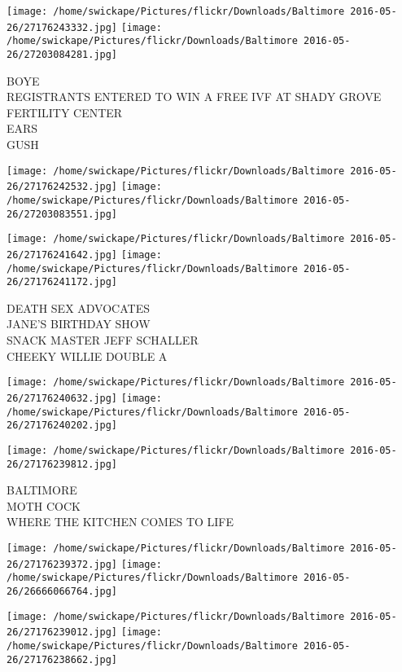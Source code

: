 \documentclass[10pt,letterpaper]{article}
\begin{document}
\texttt{[image: /home/swickape/Pictures/flickr/Downloads/Baltimore 2016-05-26/27176243332.jpg]}
\texttt{[image: /home/swickape/Pictures/flickr/Downloads/Baltimore 2016-05-26/27203084281.jpg]}

BOYE\\
REGISTRANTS ENTERED TO WIN A FREE IVF AT SHADY GROVE FERTILITY CENTER\\
EARS\\
GUSH\\
\pagebreak

\texttt{[image: /home/swickape/Pictures/flickr/Downloads/Baltimore 2016-05-26/27176242532.jpg]}
\texttt{[image: /home/swickape/Pictures/flickr/Downloads/Baltimore 2016-05-26/27203083551.jpg]}

\texttt{[image: /home/swickape/Pictures/flickr/Downloads/Baltimore 2016-05-26/27176241642.jpg]}
\texttt{[image: /home/swickape/Pictures/flickr/Downloads/Baltimore 2016-05-26/27176241172.jpg]}

DEATH SEX ADVOCATES\\
JANE'S BIRTHDAY SHOW\\
SNACK MASTER JEFF SCHALLER\\
CHEEKY WILLIE DOUBLE A\\
\pagebreak

\texttt{[image: /home/swickape/Pictures/flickr/Downloads/Baltimore 2016-05-26/27176240632.jpg]}
\texttt{[image: /home/swickape/Pictures/flickr/Downloads/Baltimore 2016-05-26/27176240202.jpg]}

\vspace{0.25in}
\texttt{[image: /home/swickape/Pictures/flickr/Downloads/Baltimore 2016-05-26/27176239812.jpg]}

BALTIMORE\\
MOTH COCK\\
WHERE THE KITCHEN COMES TO LIFE\\
\pagebreak

\texttt{[image: /home/swickape/Pictures/flickr/Downloads/Baltimore 2016-05-26/27176239372.jpg]}
\texttt{[image: /home/swickape/Pictures/flickr/Downloads/Baltimore 2016-05-26/26666066764.jpg]}

\texttt{[image: /home/swickape/Pictures/flickr/Downloads/Baltimore 2016-05-26/27176239012.jpg]}
\texttt{[image: /home/swickape/Pictures/flickr/Downloads/Baltimore 2016-05-26/27176238662.jpg]}
\end{document}
